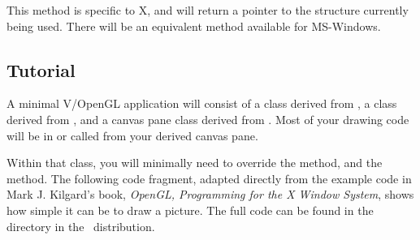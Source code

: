 This method is specific to X, and will return a pointer to the
 structure currently being used. There will
be an equivalent method available for MS-Windows.

\subsection* {Tutorial} %

A minimal V/OpenGL application will consist of a class derived
from , a class derived from , and
a canvas pane class derived from .
Most of your drawing code will be in or called from your derived
canvas pane.

Within that class, you will minimally need to override the
 method, and the  method. The
following code fragment, adapted directly from the example code
in Mark J. Kilgard's book, \emph{OpenGL, Programming for the X
Window System}, shows how simple it can be to draw a picture.
The full code can be found in the  directory
in the \V\ distribution.

